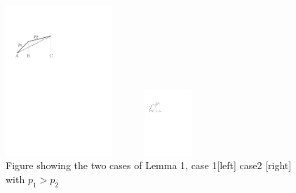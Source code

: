 \begin{figure}[htb]
\begin{minipage}[b]{0.48\linewidth}
  \centering
  \centerline{\includegraphics[width=4cm]{Lemma1_case1.pdf}}
\end{minipage}
\begin{minipage}[b]{0.48\linewidth}
  \centering
  \centerline{\includegraphics[width=4cm,height=25mm]{Lemma1_case2.pdf}}
\end{minipage}
\caption{Figure showing the two cases of Lemma 1, case 1[left] case2 [right] with $p_1>p_2$}
\label{Lemma1}
\end{figure}

